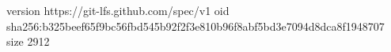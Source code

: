 version https://git-lfs.github.com/spec/v1
oid sha256:b325beef65f9bc56fbd545b92f2f3e810b96f8abf5bd3e7094d8dca8f1948707
size 2912
